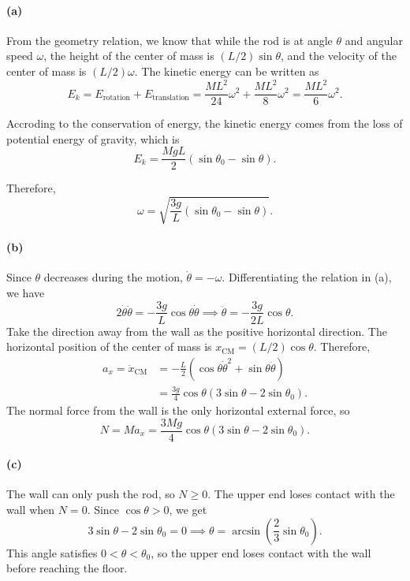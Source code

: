 \documentclass{article}
\begin{document}
\begin{solution}
	\paragraph{(a)} From the geometry relation, we know that while the rod is at angle $\theta$ and angular speed $\omega$, the height of the center of mass is $(L/2) \sin \theta$, and the velocity of the center of mass is $(L/2) \omega$. The kinetic energy can be written as
	\[ E_k = E_{\mathrm{rotation}} + E_{\mathrm{translation}} = \frac{ML^2}{24} \omega^2 + \frac{ML^2}{8} \omega^2 = \frac{ML^2}{6} \omega^2. \]

	Accroding to the conservation of energy, the kinetic energy comes from the loss of potential energy of gravity, which is
	\[ E_k = \frac{MgL}{2}(\sin \theta_0 - \sin \theta). \]

	Therefore, 
	\[ \omega = \sqrt{\frac{3g}{L}(\sin \theta_0 - \sin \theta)}. \]

	\paragraph{(b)} Since $\theta$ decreases during the motion, $\dot\theta = -\omega$. Differentiating the relation in (a), we have
	\[ 2\dot\theta\ddot\theta = -\frac{3g}{L}\cos\theta\dot\theta \implies \ddot\theta = -\frac{3g}{2L}\cos\theta. \]
	Take the direction away from the wall as the positive horizontal direction. The horizontal position of the center of mass is $x_{\mathrm{CM}} = (L/2)\cos\theta$. Therefore,
	\begin{align*}
		a_x = \ddot x_{\mathrm{CM}}
		&= -\frac{L}{2}\left(\cos\theta\dot\theta^2 + \sin\theta\ddot\theta\right) \\
		&= \frac{3g}{4}\cos\theta(3\sin\theta - 2\sin\theta_0).
	\end{align*}
	The normal force from the wall is the only horizontal external force, so
	\[ N = Ma_x = \frac{3Mg}{4}\cos\theta(3\sin\theta - 2\sin\theta_0). \]

	\paragraph{(c)} The wall can only push the rod, so $N \ge 0$. The upper end loses contact with the wall when $N = 0$. Since $\cos\theta > 0$, we get
	\[ 3\sin\theta - 2\sin\theta_0 = 0 \implies \theta = \arcsin\left(\frac{2}{3}\sin\theta_0\right). \]
	This angle satisfies $0 < \theta < \theta_0$, so the upper end loses contact with the wall before reaching the floor.
\end{solution}
\end{document}
